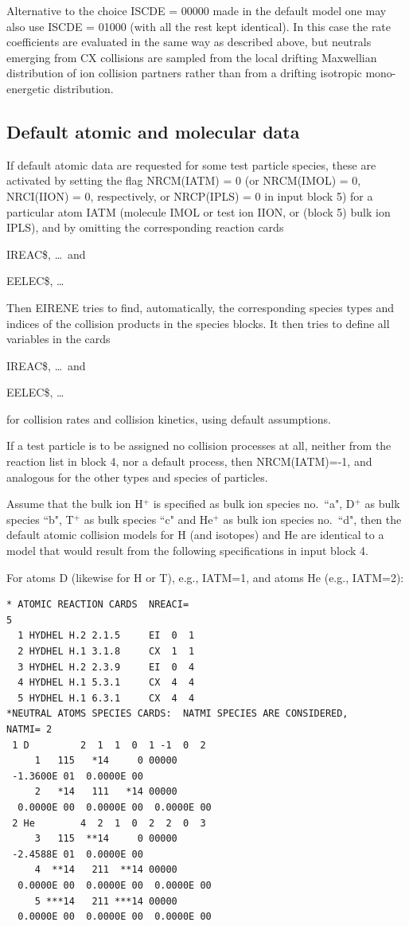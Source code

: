Alternative to the choice ISCDE = 00000 made in the default model one may also
use ISCDE = 01000 (with all the rest kept identical).
In this case the rate coefficients are evaluated in the same way as described
above, but neutrals emerging from CX collisions are sampled from the local
drifting Maxwellian distribution of ion collision partners rather than from a
drifting isotropic mono-energetic distribution.

\subsection{Default atomic and molecular data}

If default atomic data are requested for some test particle species, these are
activated by setting the flag  NRCM(IATM) = 0 (or NRCM(IMOL) = 0, NRCI(IION) =
0, respectively, or NRCP(IPLS) = 0 in input block 5) for a particular atom IATM
(molecule IMOL or test ion IION, or (block 5) bulk ion IPLS), and by omitting
the corresponding reaction cards

IREAC\$, \dots\ and

EELEC\$, \dots

Then EIRENE tries to find, automatically, the corresponding species types and
indices of the collision products in the species blocks.
It then tries to define all variables in the cards

IREAC\$, \dots\ and

EELEC\$, \dots

for collision rates and collision kinetics, using default assumptions.

If a test particle is to be assigned no collision processes at all, neither
from the reaction list in block 4, nor a default process, then NRCM(IATM)=-1,
and analogous for the other types and species of particles.


Assume that the bulk ion H$^+$ is specified as bulk ion species no.\ ``a",
D$^+$ as bulk species ``b", T$^+$ as bulk species ``c" and He$^+$ as bulk ion
species no.\ ``d", then the default atomic collision models for H  (and
isotopes) and He are identical to a model that would result from the following
specifications in input block 4.

For atoms D (likewise for H or T), e.g., IATM=1, and atoms He (e.g., IATM=2):

\begin{lstlisting}
* ATOMIC REACTION CARDS  NREACI=
5
  1 HYDHEL H.2 2.1.5     EI  0  1
  2 HYDHEL H.1 3.1.8     CX  1  1
  3 HYDHEL H.2 2.3.9     EI  0  4
  4 HYDHEL H.1 5.3.1     CX  4  4
  5 HYDHEL H.1 6.3.1     CX  4  4
*NEUTRAL ATOMS SPECIES CARDS:  NATMI SPECIES ARE CONSIDERED,
NATMI= 2
 1 D         2  1  1  0  1 -1  0  2
     1   115   *14     0 00000
 -1.3600E 01  0.0000E 00
     2   *14   111   *14 00000
  0.0000E 00  0.0000E 00  0.0000E 00
 2 He        4  2  1  0  2  2  0  3
     3   115  **14     0 00000
 -2.4588E 01  0.0000E 00
     4  **14   211  **14 00000
  0.0000E 00  0.0000E 00  0.0000E 00
     5 ***14   211 ***14 00000
  0.0000E 00  0.0000E 00  0.0000E 00
\end{lstlisting}

